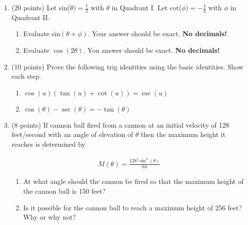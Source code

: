 \documentclass[fleqn]{article}
\renewcommand{\thispagestyle}[1]{}
\begin{document}
\pagebreak
\thispagestyle{fancy}{
\lhead{}
}

\begin{enumerate}
\section*{Free Response}
\item (20 points) Let sin($\theta) = \frac{1}{2}$ with $\theta$ in Quadrant I.  Let cot($\phi) = -\frac{4}{3}$ with $\phi$ in Quadrant II.  
\begin{enumerate}
\item Evaluate sin$(\theta + \phi)$.  Your answer should be exact. {\bf No decimals!}

\vspace{3.7in}

\item Evaluate $\cos(2\theta)$.  You answer should be exact. {\bf No decimals!}

\vspace{1.5in}
\end{enumerate}

\item (10 points) Prove the following trig identities using the basic identities.  Show each step.

\begin{enumerate}
\item $\cos(u)(\tan(u) + \cot(u)) = \csc(u)$
\vspace{1.5in}
\item $\cos(\theta) - \sec(\theta) = -\tan(\theta)$
\end{enumerate}
\vspace{0.5in}

\pagebreak
\thispagestyle{fancy}{
\lhead{}
}

\item (8 points) If cannon ball fired from a cannon at an initial velocity of 128 feet/second with an angle of elevation of $\theta$ then the maximum height it reaches is determined by

\begin{align*}
M(\theta) = \frac{128^2\sin^2(\theta)}{64}
\end{align*}

\begin{enumerate}
\item At what angle should the cannon be fired so that the maximum height of the cannon ball is 150 feet?
\vspace{2 in}
\item Is it possible for the cannon ball to reach a maximum height of 256 feet? Why or why not?
\vspace{1in}
\end{enumerate}


\end{enumerate}
\end{document}
